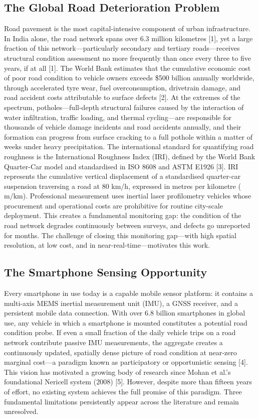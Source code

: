 \documentclass[conference]{IEEEtran}
\begin{document}
\subsection{The Global Road Deterioration Problem}
Road pavement is the most capital-intensive component of urban infrastructure.
In India alone, the road network spans over 6.3 million kilometres [1], yet a large fraction of this network---particularly secondary and tertiary roads---receives structural condition assessment no more frequently than once every three to five years, if at all [1].
The World Bank estimates that the cumulative economic cost of poor road condition to vehicle owners exceeds \$500 billion annually worldwide, through accelerated tyre wear, fuel overconsumption, drivetrain damage, and road accident costs attributable to surface defects [2].
At the extremes of the spectrum, potholes---full-depth structural failures caused by the interaction of water infiltration, traffic loading, and thermal cycling---are responsible for thousands of vehicle damage incidents and road accidents annually, and their formation can progress from surface cracking to a full pothole within a matter of weeks under heavy precipitation.
The international standard for quantifying road roughness is the International Roughness Index (IRI), defined by the World Bank Quarter-Car model and standardised in ISO 8608 and ASTM E1926 [3].
IRI represents the cumulative vertical displacement of a standardised quarter-car suspension traversing a road at 80 km/h, expressed in metres per kilometre ($\text{m/km}$).
Professional measurement uses inertial laser profilometry vehicles whose procurement and operational costs are prohibitive for routine city-scale deployment.
This creates a fundamental monitoring gap: the condition of the road network degrades continuously between surveys, and defects go unreported for months.
The challenge of closing this monitoring gap---with high spatial resolution, at low cost, and in near-real-time---motivates this work.

\subsection{The Smartphone Sensing Opportunity}
Every smartphone in use today is a capable mobile sensor platform: it contains a multi-axis MEMS inertial measurement unit (IMU), a GNSS receiver, and a persistent mobile data connection.
With over 6.8 billion smartphones in global use, any vehicle in which a smartphone is mounted constitutes a potential road condition probe.
If even a small fraction of the daily vehicle trips on a road network contribute passive IMU measurements, the aggregate creates a continuously updated, spatially dense picture of road condition at near-zero marginal cost---a paradigm known as participatory or opportunistic sensing [4].
This vision has motivated a growing body of research since Mohan et al.'s foundational Nericell system (2008) [5].
However, despite more than fifteen years of effort, no existing system achieves the full promise of this paradigm.
Three fundamental limitations persistently appear across the literature and remain unresolved.
\end{document}
